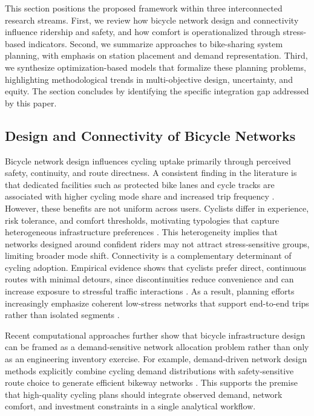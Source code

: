 \documentclass[preprint,authoryear,10pt]{elsarticle}
\begin{document}
This section positions the proposed framework within three interconnected research streams. First, we review how bicycle network design and connectivity influence ridership and safety, and how comfort is operationalized through stress-based indicators. Second, we summarize approaches to bike-sharing system planning, with emphasis on station placement and demand representation. Third, we synthesize optimization-based models that formalize these planning problems, highlighting methodological trends in multi-objective design, uncertainty, and equity. The section concludes by identifying the specific integration gap addressed by this paper.

\subsection{Design and Connectivity of Bicycle Networks}

Bicycle network design influences cycling uptake primarily through perceived safety, continuity, and route directness. A consistent finding in the literature is that dedicated facilities such as protected bike lanes and cycle tracks are associated with higher cycling mode share and increased trip frequency \citep{mitra2017Modesubstitutioneffect, dill2003BicycleCommutingFacilities, buehler2012Cyclingwork90}. However, these benefits are not uniform across users. Cyclists differ in experience, risk tolerance, and comfort thresholds, motivating typologies that capture heterogeneous infrastructure preferences \citep{dill2013FourTypesCyclists, damant-sirois2014WhatsYourType}. This heterogeneity implies that networks designed around confident riders may not attract stress-sensitive groups, limiting broader mode shift. Connectivity is a complementary determinant of cycling adoption. Empirical evidence shows that cyclists prefer direct, continuous routes with minimal detours, since discontinuities reduce convenience and can increase exposure to stressful traffic interactions \citep{schoner2014missinglinkbicycle, fitch2022Whatmakesbicyclists, dill2009BicyclingTransportationHealth, reggiani2022Understandingbikeabilitymethodology}. As a result, planning efforts increasingly emphasize coherent low-stress networks that support end-to-end trips rather than isolated segments \citep{rayfield2011Connectivityconservationframework}.

Recent computational approaches further show that bicycle infrastructure design can be framed as a demand-sensitive network allocation problem rather than only as an engineering inventory exercise. For example, demand-driven network design methods explicitly combine cycling demand distributions with safety-sensitive route choice to generate efficient bikeway networks \citep{steinackerDemandDriven2022}. This supports the premise that high-quality cycling plans should integrate observed demand, network comfort, and investment constraints in a single analytical workflow.
\end{document}
